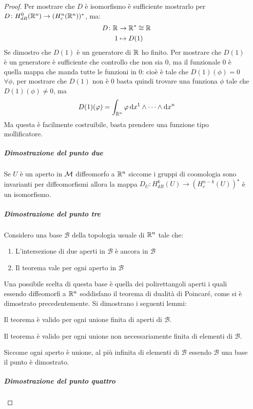 \begin{proof}
  Per mostrare che $ D $ è isomorfismo è sufficiente mostrarlo per
  $ D \colon H^0_{dR}(\mathbb{R}^{n}) \to (H^n_c(\mathbb{R}^{n}))^* $, ma:
  \begin{align*}
    D \colon \mathbb{R}^{} & \to {\mathbb{R}^{}}^* \cong \mathbb{R}^{} \\
    1 & \mapsto D(1)
  \end{align*}
  Se dimostro che $ D(1) $ è un generatore di $ \mathbb{R}^{} $ ho finito. Per mostrare
  che $ D(1) $ è un generatore è sufficiente che controllo che non sia $ 0 $,
  ma il funzionale $ 0 $ è quella mappa che manda tutte le funzioni in $ 0 $:
  cioè è tale che $ D(1)(\phi) = 0 $ $ \forall \phi $, per mostrare che $ D(1) $ non è $ 0 $
  basta quindi trovare una funziona $ \phi $ tale che $ D(1)(\phi) \not = 0 $, ma
  \[
    D(1)(\varphi) = \int_{\mathbb{R}^{n}} \varphi \operatorname{d}\!{x}^1 \wedge \dots \wedge \operatorname{d}\!{x}^n
  \]
  Ma questa è facilmente costruibile, basta prendere una funzione tipo
  mollificatore.

  \subparagraph{Dimostrazione del punto due} Se $ U $ è un aperto in $ \mathcal{M} $
  diffeomorfo a $ \mathbb{R}^{n} $ siccome i gruppi di coomologia sono invarianti per
  diffeomorfismi allora la mappa
  $ D_U \colon H^k_{dR}(U) \to (H^{n-k}_c(U))^\star $ è un isomorfismo.

  \subparagraph{Dimostrazione del punto tre} Considero una base $ \mathcal{B} $
  della topologia usuale di $ \mathbb{R}^{n} $ tale che:
  \begin{enumerate}
  \item L'intersezione di due aperti in $ \mathcal{B} $ è ancora in $ \mathcal{B} $
  \item Il teorema vale per ogni aperto in $ \mathcal{B} $
  \end{enumerate}
  Una possibile scelta di questa base è quella dei polirettangoli aperti i quali
  essendo diffeomorfi a $ \mathbb{R}^{n} $ soddisfano il teorema di dualità di Poincaré,
  come si è dimostrato precedentemente.
  Si dimostrano i seguenti lemmi:
  \begin{lemma}
    Il teorema è valido per ogni unione finita di aperti di $ \mathcal{B} $.
  \end{lemma}
  \begin{lemma}
    Il teorema è valido per ogni unione non necessariamente finita di elementi di $ \mathcal{B} $.
  \end{lemma}
  Siccome ogni aperto è unione, al più infinita di elementi di $ \mathcal{B} $ essendo $ \mathcal{B} $
  una base il punto è dimostrato.

  \subparagraph{Dimostrazione del punto quattro}


\end{proof}
